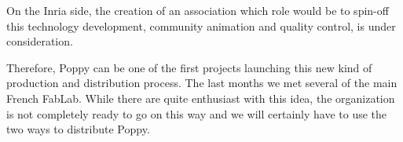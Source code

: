 On the Inria side, the creation of an association which role would be to spin-off this technology development, community animation and quality control, is under consideration.



Therefore, Poppy can be one of the first projects launching this new kind of production and distribution process. The last months we met several of the main French FabLab. While there are quite enthusiast with this idea, the organization is not completely ready to go on this way and we will certainly have to use the two ways to distribute Poppy.









